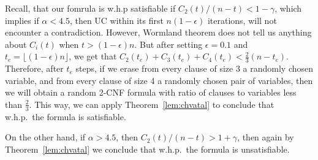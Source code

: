 \documentclass[10pt]{article}
\begin{document}
Recall, that our fomrula is w.h.p satisfiable if $C_2(t)/(n - t) < 1 - \gamma $, which implies if $\alpha < 4.5$, then UC within its first $n(1 - \epsilon)$ iterations, will not encounter a contradiction. However, Wormland theorem does not tell us anything about $C_i(t)$ when $t > (1 - \epsilon) n$. But after setting $\epsilon = 0.1$ and $t_e = \lfloor (1 - \epsilon)n \rfloor$, we get that $C_2(t_e) + C_3(t_e) + C_4(t_e) < \frac{2}{3} (n - t_e)$. Therefore, after $t_e$ steps, if we erase from every clause of size 3 a randomly chosen variable, and from every clause of size 4 a randomly chosen pair of variables, then we will obtain a random 2-CNF formula with ratio of clauses to variables less than $\frac{2}{3}$. This way, we can apply Theorem~\ref{lem:chvatal} to conclude that w.h.p.\ the formula is satisfiable.
\par
On the other hand, if $\alpha > 4.5$, then $C_2(t)/(n-t) > 1 + \gamma$, then again by Theorem~\ref{lem:chvatal} we conclude that w.h.p.\ the formula is unsatisfiable.








{}
\end{document}
